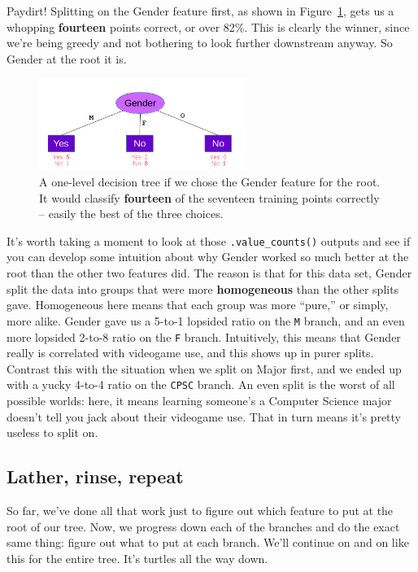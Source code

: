 Paydirt! Splitting on the \textsf{Gender} feature first, as shown in
Figure~\ref{fig:genderOnTop}, gets us a whopping \textbf{fourteen} points correct,
or over 82\%. This is clearly the winner, since we're being greedy and not
bothering to look further downstream anyway. So \textsf{Gender} at the root it
is.

\begin{figure}[ht]
\centering
\includegraphics[width=0.6\textwidth]{genderOnTop.png}
\caption{A one-level decision tree if we chose the \textsf{Gender} feature for
the root. It would classify \textbf{fourteen} of the seventeen training points
correctly -- easily the best of the three choices.}
\label{fig:genderOnTop}
\end{figure}

It's worth taking a moment to look at those \texttt{.value\_counts()} outputs
and see if you can develop some intuition about why \textsf{Gender} worked so
much better at the root than the other two features did. The reason is that for
this data set, \textsf{Gender} split the data into groups that were more
\textbf{homogeneous} than the other splits gave. Homogeneous here means that
each group was more ``pure,'' or simply, more alike. \textsf{Gender} gave us a
5-to-1 lopsided ratio on the \texttt{M} branch, and an even more lopsided
2-to-8 ratio on the \texttt{F} branch. Intuitively, this means that
\textsf{Gender} really is correlated with videogame use, and this shows up in
purer splits. Contrast this with the situation when we split on \textsf{Major}
first, and we ended up with a yucky 4-to-4 ratio on the \texttt{CPSC} branch.
An even split is the worst of all possible worlds: here, it means learning
someone's a Computer Science major doesn't tell you jack about their videogame
use. That in turn means it's pretty useless to split on.

\subsection{Lather, rinse, repeat}


So far, we've done all that work just to figure out which feature to put at the
root of our tree. Now, we progress down each of the branches and do the exact
same thing: figure out what to put at each branch. We'll continue on and on
like this for the entire tree. It's turtles all the way down.

